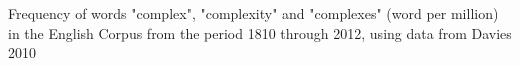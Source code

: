 Frequency of words "complex", "complexity" and "complexes" (word per million) in the English Corpus from the period 1810 through 2012, using data from Davies 2010